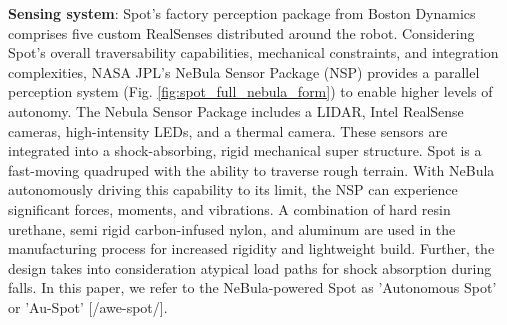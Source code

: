 \documentclass[letterpaper, 10pt, conference]{ieeeconf}      %
\newcommand{\ph}[1]{{\textbf{#1}:}} %
\newcommand{\rev}[1]{{\color{blue} #1 }} %
\begin{document}
\ph{Sensing system} 
Spot's factory perception package from Boston Dynamics comprises five custom RealSenses distributed around the \rev{robot.}Considering Spot’s overall traversability capabilities, mechanical constraints, and integration complexities, NASA JPL's NeBula Sensor Package (NSP) provides %
a parallel perception system (Fig. \ref{fig:spot_full_nebula_form}) to enable higher levels of autonomy. 
The Nebula Sensor Package includes a LIDAR, Intel RealSense cameras, high-intensity LEDs, and a thermal camera.
\rev{These sensors are integrated into a shock-absorbing, rigid mechanical super structure.}Spot is a fast-moving quadruped with the ability to traverse rough terrain. 
With NeBula autonomously driving this capability to its limit, the NSP can experience significant forces, moments, and vibrations. 
A combination of hard resin urethane, semi rigid carbon-infused nylon, and aluminum are used in the manufacturing process for increased rigidity and lightweight build. 
Further, the design takes into consideration atypical load paths for shock absorption during falls. %
\rev{In this paper, we refer to the NeBula-powered Spot as 'Autonomous Spot' or 'Au-Spot' [/awe-spot/].} 
\end{document}
